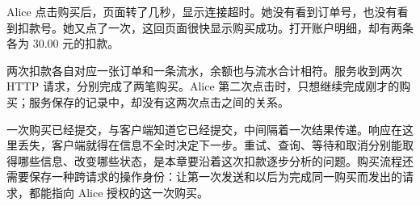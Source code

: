 Alice 点击购买后，页面转了几秒，显示连接超时。她没有看到订单号，也没有看到扣款号。她又点了一次，这回页面很快显示购买成功。打开账户明细，却有两条各为 30.00 元的扣款。

两次扣款各自对应一张订单和一条流水，余额也与流水合计相符。服务收到两次 HTTP 请求，分别完成了两笔购买。Alice 第二次点击时，只想继续完成刚才的购买；服务保存的记录中，却没有这两次点击之间的关系。

一次购买已经提交，与客户端知道它已经提交，中间隔着一次结果传递。响应在这里丢失，客户端就得在信息不全时决定下一步。重试、查询、等待和取消分别能取得哪些信息、改变哪些状态，是本章要沿着这次扣款逐步分析的问题。购买流程还需要保存一种跨请求的操作身份：让第一次发送和以后为完成同一购买而发出的请求，都能指向 Alice 授权的这一次购买。

